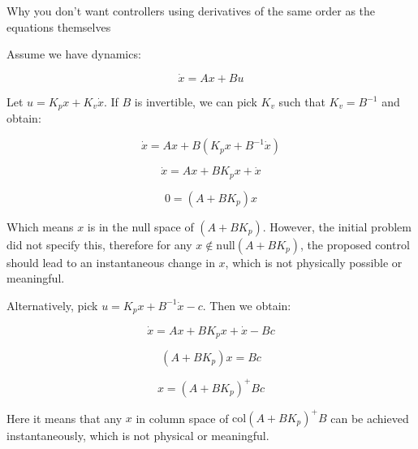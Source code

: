 \documentclass[12pt]{article}
\begin{document}
\large %



\begin{center}
{\Large Why you don't want controllers using derivatives of the same order as the equations themselves} 
\end{center}
\vspace{0.05in}


\begin{flushleft}


Assume we have dynamics:

\[
\dot x = Ax + Bu
\]

Let $u =  K_p x + K_v \dot x $. If $B$ is invertible, we can pick $K_v$ such that $K_v = B^{-1}$ and obtain:

\[
\dot x = Ax + B(K_p x + B^{-1} \dot x)
\]

\[
\dot x = Ax + B K_p x + \dot x
\]

\[
0 = (A + B K_p) x
\]

Which means $x$ is in the null space of $(A + B K_p)$. However, the initial problem did not specify this, therefore for any $x \not\in \text{null}(A + B K_p)$, the proposed control should lead to an instantaneous change in $x$, which is not physically possible or meaningful.

\end{flushleft}

\bigskip

\begin{flushleft}

Alternatively, pick $u =  K_p x + B^{-1} \dot x  - c$. Then we obtain:

\[
\dot x = Ax + B K_p x + \dot x - B c
\]

\[
(A + B K_p) x = B c
\]

\[
 x = (A + B K_p)^+ B c
\]


Here it means that any $x$ in column space of $\text{col}(A + B K_p)^+ B$ can be achieved instantaneously, which is not physical or meaningful.

\end{flushleft}
\end{document}
